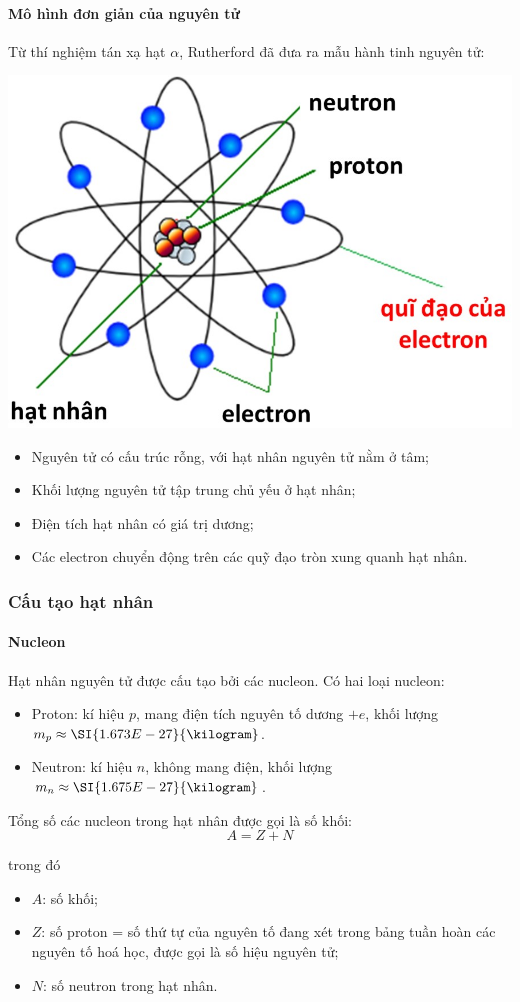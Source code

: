 \begin{tomtat}
	\paragraph{Mô hình đơn giản của nguyên tử}
	Từ thí nghiệm tán xạ hạt $\alpha$, Rutherford đã đưa ra mẫu hành tinh nguyên tử:
	\begin{center}
		\includegraphics[width=0.3\linewidth]{figs/VN12-Y24-PH-SYL-025-3}
	\end{center}
	\begin{itemize}
		\item Nguyên tử có cấu trúc rỗng, với hạt nhân nguyên tử nằm ở tâm;
		\item Khối lượng nguyên tử tập trung chủ yếu ở hạt nhân;
		\item Điện tích hạt nhân có giá trị dương;
		\item Các electron chuyển động trên các quỹ đạo tròn xung quanh hạt nhân.
	\end{itemize}
	\subsubsection{Cấu tạo hạt nhân}
	\paragraph{Nucleon}
	Hạt nhân nguyên tử được cấu tạo bởi các nucleon. Có hai loại nucleon:
	\begin{itemize}
		\item Proton: kí hiệu $p$, mang điện tích nguyên tố dương $+e$, khối lượng $m_p\approx\SI{1.673E-27}{\kilogram}$.
		\item Neutron: kí hiệu $n$, không mang điện, khối lượng $m_n\approx\SI{1.675E-27}{\kilogram}$.
	\end{itemize}
	\begin{boxdl}
		Tổng số các nucleon trong hạt nhân được gọi là số khối:
		\begin{equation}
			A=Z+N
		\end{equation}
	\end{boxdl}
	trong đó
	\begin{itemize}
		\item $A$: số khối;
		\item $Z$: số proton = số thứ tự của nguyên tố đang xét trong bảng tuần hoàn các nguyên tố hoá học, được gọi là số hiệu nguyên tử;
		\item $N$: số neutron trong hạt nhân.
	\end{itemize}

\end{tomtat}
